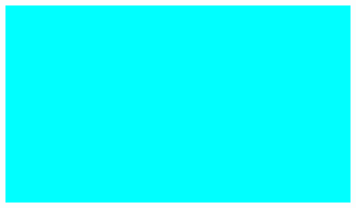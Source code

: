 \documentclass{article}
\begin{document}
\includegraphics[width=1\textwidth]{media/image14.png}
\end{document}
